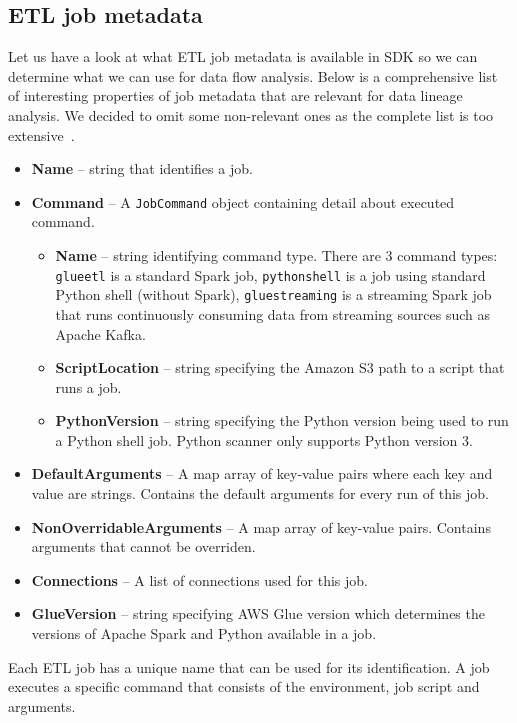 \subsection{ETL job metadata}
Let us have a look at what ETL job metadata is available in SDK so we can determine what we can use for data flow analysis. Below is a comprehensive list of interesting properties of job metadata that are relevant for data lineage analysis. We decided to omit some non-relevant ones as the complete list is too extensive~\cite{gluejobs}.
\begin{itemize}
    \item \textbf{Name} – string that identifies a job.
    \item \textbf{Command} – A \texttt{JobCommand} object containing detail about executed command.
    \begin{itemize}
        \item \textbf{Name} – string identifying command type. There are 3 command types: \texttt{glueetl} is a standard Spark job, \texttt{pythonshell} is a job using standard Python shell (without Spark), \texttt{gluestreaming} is a streaming Spark job that runs continuously consuming data from streaming sources such as Apache Kafka. 
        \item \textbf{ScriptLocation} – string specifying the Amazon S3 path to a script that runs a job.
        \item \textbf{PythonVersion} – string specifying the Python version being used to run a Python shell job. Python scanner only supports Python version 3.    
    \end{itemize}
    \item \textbf{DefaultArguments} – A map array of key-value pairs where each key and value are strings. Contains the default arguments for every run of this job.
    \item \textbf{NonOverridableArguments} – A map array of key-value pairs. Contains arguments that cannot be overriden.
    \item \textbf{Connections} – A list of connections used for this job.
    \item \textbf{GlueVersion} – string specifying AWS Glue version which determines the versions of Apache Spark and Python available in a job.
\end{itemize}
\par
Each ETL job has a unique name that can be used for its identification. A job executes a specific command that consists of the environment, job script and arguments.
\par

